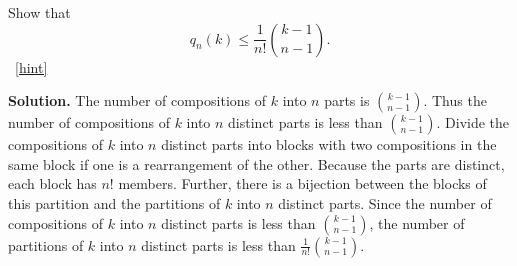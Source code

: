 \documentclass{book}
\begin{document}
\setcounter{project}{310}
\addtocounter{project}{-1}
\begin{activity}[]\label{activity-303}
\hypertarget{p-1612}{}%
Show that%
\begin{equation*}
q_n(k) \le \frac{1}{n!}\binom{k-1}{n-1}.
\end{equation*}
%
~\hfill{\tiny\hyperlink{a-310}{[hint]}\hypertarget{q-310}{}}\par\smallskip%
\noindent\textbf{Solution.}\hypertarget{solution-243}{}\quad%
\hypertarget{p-1614}{}%
The number of compositions of \(k\) into \(n\) parts is \(\binom{k-1}{n-1}\). Thus the number of compositions of \(k\) into \(n\) distinct parts is less than \(\binom{k-1}{n-1}\). Divide the compositions of \(k\) into \(n\) distinct parts into blocks with two compositions in the same block if one is a rearrangement of the other. Because the parts are distinct, each block has \(n!\) members. Further, there is a bijection between the blocks of this partition and the partitions of \(k\) into \(n\) distinct parts. Since the number of compositions of \(k\) into \(n\) distinct parts is less than \(\binom{k-1}{n-1}\), the number of partitions of \(k\) into \(n\) distinct parts is less than \(\frac{1}{n!}  \binom{k-1}{n-1}\).%
\end{activity}
\end{document}
